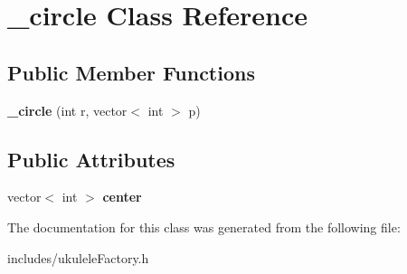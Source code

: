 \hypertarget{class__circle}{}\section{\+\_\+circle Class Reference}
\label{class__circle}
\subsection*{Public Member Functions}
\begin{DoxyCompactItemize}
\item 
\hypertarget{class__circle_a83b2687b4fdb78e71d5b08e5cb973176}{}\label{class__circle_a83b2687b4fdb78e71d5b08e5cb973176} 
{\bfseries \+\_\+circle} (int r, vector$<$ int $>$ p)
\end{DoxyCompactItemize}
\subsection*{Public Attributes}
\begin{DoxyCompactItemize}
\item 
\hypertarget{class__circle_a47f68e731e4e7feed9954dcaad6a667a}{}\label{class__circle_a47f68e731e4e7feed9954dcaad6a667a} 
vector$<$ int $>$ {\bfseries center}
\end{DoxyCompactItemize}


The documentation for this class was generated from the following file\+:\begin{DoxyCompactItemize}
\item 
includes/ukulele\+Factory.\+h\end{DoxyCompactItemize}
